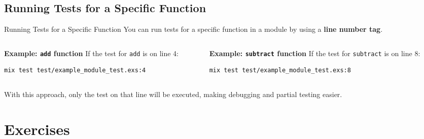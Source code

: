 \documentclass[aspectratio=169, table]{beamer}
\begin{document}
\subsection{Running Tests for a Specific Function}
\begin{frame}[fragile]{Running Tests for a Specific Function}
\vspace{15pt}
You can run tests for a specific function in a module  
by using a \textbf{line number tag}.  
\vspace{10pt}
\begin{columns}
\begin{column}[t]{0.48\textwidth}
\textbf{Example: \texttt{add} function}  
If the test for \texttt{add} is on line 4:  
\begin{lstlisting}[language=bash]
mix test test/example_module_test.exs:4
\end{lstlisting}
\end{column}

\begin{column}[t]{0.52\textwidth}
\textbf{Example: \texttt{subtract} function}  
If the test for \texttt{subtract} is on line 8:  
\begin{lstlisting}[language=bash]
mix test test/example_module_test.exs:8
\end{lstlisting}
\end{column}
\end{columns}

\vspace{8pt}
With this approach, only the test on that line will be executed,  
making debugging and partial testing easier.  
\end{frame}

\section{Exercises}
\end{document}
